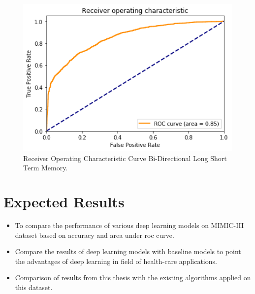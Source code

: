 \documentclass[12pt,a4paper]{article}
\newlength{\defbaselineskip}
\newcommand{\setlinespacing}[1]%
           {\setlength{\baselineskip}{#1 \defbaselineskip}}
\begin{document}
\begin{figure}[H]
    \centerline{\includegraphics[width=4.5in]{blstm4.png}}
    \caption{Receiver Operating Characteristic Curve Bi-Directional Long Short Term Memory.}
\end{figure}

\section{Expected Results}
\begin{itemize}
    \item To compare the performance of various deep learning models on MIMIC-III dataset based on accuracy and area under roc curve.
    \item Compare the results of deep learning models with baseline models to point the advantages of deep learning in field of health-care applications.
    \item Comparison of results from this thesis with the existing algorithms applied on this dataset.
\end{itemize}


\setlinespacing{1}

\newpage

\end{document}
